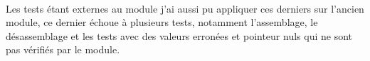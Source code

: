 \documentclass[11pt, book, english, french, standardlists]{upmethodology-document}
\begin{document}
				\paragraph*{}
					Les tests étant externes au module j'ai aussi pu appliquer ces derniers sur l'ancien module, ce dernier échoue à plusieurs tests, notamment l'assemblage, le désassemblage et les tests avec des valeurs erronées et pointeur nuls qui ne sont pas vérifiés par le module.
	\nocite{*}
	
	
	\printglossary[type=\acronymtype,title=Lexique,toctitle=Lexique]{}
		\setcounter{section}{0}
		\renewcommand{\thesection}{\Alph{section}}
		\renewcommand{\theHsection}{appendixsection.\Alph{section}}
\end{document}
